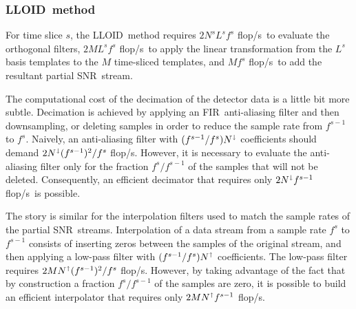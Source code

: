 \documentclass[preprint2]{aastex}
\newcommand{\SNR}{SNR}%
\newcommand{\numtmps}{\ensuremath{M}}
\newcommand{\svdtmps}[1]{\ensuremath{L^#1}}
\newcommand{\numsvdtmps}{\svdtmps{s}}
\newcommand{\slicesamps}[1]{\ensuremath{N^#1}}
\newcommand{\slicessamps}{\slicesamps{s}}
\newcommand{\fir}{FIR}%
\newcommand{\flops}{flop/s}
\newcommand{\lloid}{LLOID}%
\begin{document}
\subsubsection{\label{sec:lloid-method}\lloid\ method}

For time slice $s$, the \lloid\ method requires $2 \slicessamps \numsvdtmps f^s$ \flops\ 
to evaluate the orthogonal filters, $2 \numtmps \numsvdtmps f^s$ \flops\ to
apply the  linear transformation from the $\numsvdtmps$ basis templates to the
$\numtmps$ time-sliced templates, and $\numtmps f^s$ \flops\ to add the
resultant partial \SNR\ stream.

The computational cost of the decimation of the detector data is a little bit
more subtle.  Decimation is achieved by applying an \fir\ anti-aliasing filter
and then downsampling, or deleting samples in order to reduce the sample rate
from $f^{s-1}$ to $f^s$.  Naively, an anti-aliasing filter with
$(f^{s-1} / f^s) N^\shortdownarrow$ coefficients should demand
$2 N^\shortdownarrow (f^{s-1})^2 / f^s$ \flops.  However, it is necessary to
evaluate the anti-aliasing filter only for the fraction $f^s / f^{s-1}$ of the
samples that will not be deleted.  Consequently, an efficient decimator that
requires only $2 N^\shortdownarrow f^{s-1}$ \flops\ is possible.

The story is similar for the interpolation filters used to match the sample
rates of the partial \SNR\ streams.  Interpolation of a data stream from a
sample rate $f^s$ to $f^{s-1}$ consists of inserting zeros between the samples
of the original stream, and then applying a low-pass filter with
$(f^{s-1} / f^s) N^\shortuparrow$ coefficients.  The low-pass filter requires
$2 M N^\shortuparrow (f^{s-1})^2 / f^s$ \flops.  However, by taking advantage
of the fact that by construction a fraction $f^s / f^{s-1}$ of the samples are
zero, it is possible to build an efficient interpolator that requires only
$2 M N^\shortuparrow f^{s-1}$ \flops.
\end{document}

